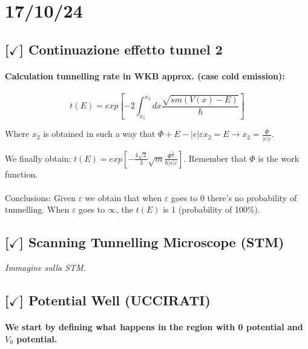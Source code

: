 \section{17/10/24}

\subsection{[$\checkmark$] Continuazione effetto tunnel 2}

\paragraph{Calculation tunnelling rate in WKB approx. (case cold emission):}

$$t(E) = exp \left[ -2 \int_{x_1}^{x_2} dx \frac{\sqrt{sm(V(x) - E)}}{\hbar} \right]$$

Where $x_2$ is obtained in such a way that $\Phi + E - |e|\varepsilon x_2 = E \rightarrow x_2 = \frac{\Phi}{|e|\varepsilon}$.

\vspace{10pt}

\noindent We finally obtain: $t(E) = exp \left[ -\frac{4\sqrt 2}{3} \sqrt m \frac{\Phi^{\frac{3}{2}}}{\hbar |e| \varepsilon} \right]$. Remember that $\Phi$ is the work function.

\vspace{10pt}

\paragraph{}{Conclusions:} Given $\varepsilon$ we obtain that when $\varepsilon$ goes to 0 there's no probability of tunnelling. When $\varepsilon$ goes to $\infty$, the $t(E)$ is 1 (probability of 100\%).

\subsection{[$\checkmark$] Scanning Tunnelling Microscope (STM)}

\vspace{10pt}
\textit{Immagine sulla STM.}
\vspace{10pt}

\subsection{[$\checkmark$] Potential Well (UCCIRATI)}

\paragraph{We start by defining what happens in the region with 0 potential and $V_0$ potential. } 

